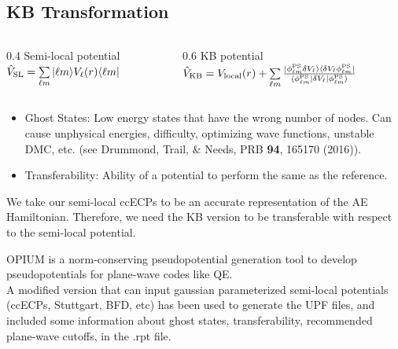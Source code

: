 \subsection{KB Transformation}
\begin{frame}
    \begin{columns}
        \begin{column}
            {0.4\textwidth}
            \centering
            {\color{ForestGreen}Semi-local potential}\\
            $\hat{V}_{\rm SL} = \sum\limits_{\ell m}  | \ell m\rangle V_\ell(r) \langle\ell m|$
        \end{column}
        \begin{column}
            {0.6\textwidth}
            \centering
            {\color{ForestGreen}KB potential}\\
            $\hat{V}_{\rm KB} = V_{\rm local}(r) + \sum\limits_{\ell m} \frac{| \phi_{\ell m}^{\rm PS} \delta V_\ell \rangle \langle \delta V_\ell \phi_{\ell m}^{\rm PS}|}{\langle \phi_{\ell m}^{\rm PS} |\delta V_\ell | \phi_{\ell m}^{\rm PS}\rangle} $
        \end{column}
    \end{columns}
    \bigskip
    \begin{itemize}
        \item[] {\color{NavyBlue} Ghost States:} Low energy states that have the wrong number of nodes. Can cause unphysical energies, difficulty, optimizing wave functions, unstable DMC, etc. (see Drummond, Trail, \& Needs, PRB {\bf 94}, 165170 (2016)).
        \item[] {\color{NavyBlue} Transferability:} Ability of a potential to perform the same as the reference. 
    \end{itemize}
    \bigskip

    We take our semi-local ccECPs to be an accurate representation of the AE Hamiltonian. Therefore, we need the KB version to be transferable with respect to the semi-local potential.

\end{frame}

\begin{frame}
    OPIUM is a norm-conserving pseudopotential generation tool to develop pseudopotentials for plane-wave codes like QE.\\
    \bigskip
    A modified version that can input gaussian parameterized semi-local potentials (ccECPs, Stuttgart, BFD, etc) has been used to generate the UPF files, and included some information about ghost states, transferability, recommended plane-wave cutoffs, in the .rpt file.
\end{frame}

